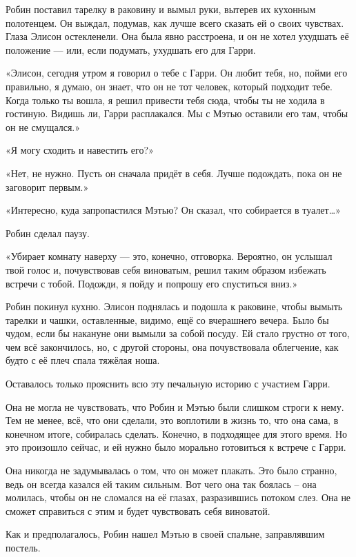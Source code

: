 \documentclass[a4paper,12pt]{book}
\begin{document}
\par
Робин поставил тарелку в раковину и вымыл руки, вытерев их кухонным полотенцем. Он выждал, подумав, как лучше всего сказать ей о своих чувствах. Глаза Элисон остекленели. Она была явно расстроена, и он не хотел ухудшать её положение — или, если подумать, ухудшать его для Гарри.
\par
«Элисон, сегодня утром я говорил о тебе с Гарри. Он любит тебя, но, пойми его правильно, я думаю, он знает, что он не тот человек, который подходит тебе. Когда только ты вошла, я решил привести тебя сюда, чтобы ты не ходила в гостиную. Видишь ли, Гарри расплакался. Мы с Мэтью оставили его там, чтобы он не смущался.»
\par
«Я могу сходить и навестить его?»
\par
«Нет, не нужно. Пусть он сначала придёт в себя. Лучше подождать, пока он не заговорит первым.»
\par
«Интересно, куда запропастился Мэтью? Он сказал, что собирается в туалет…»
\par
Робин сделал паузу.
\par
«Убирает комнату наверху — это, конечно, отговорка. Вероятно, он услышал твой голос и, почувствовав себя виноватым, решил таким образом избежать встречи с тобой. Подожди, я пойду и попрошу его спуститься вниз.»
\par
Робин покинул кухню. Элисон поднялась и подошла к раковине, чтобы вымыть тарелки и чашки, оставленные, видимо, ещё со вчерашнего вечера. Было бы чудом, если бы накануне они вымыли за собой посуду. Ей стало грустно от того, чем всё закончилось, но, с другой стороны, она почувствовала облегчение, как будто с её плеч спала тяжёлая ноша.
\par
Оставалось только прояснить всю эту печальную историю с участием Гарри.
\par
Она не могла не чувствовать, что Робин и Мэтью были слишком строги к нему. Тем не менее, всё, что они сделали, это воплотили в жизнь то, что она сама, в конечном итоге, собиралась сделать. Конечно, в подходящее для этого время. Но это произошло сейчас, и ей нужно было морально готовиться к встрече с Гарри.
\par
Она никогда не задумывалась о том, что он может плакать. Это было странно, ведь он всегда казался ей таким сильным. Вот чего она так боялась – она молилась, чтобы он не сломался на её глазах,  разразившись потоком слез. Она не сможет справиться с этим и будет чувствовать себя виноватой.
\par
Как и предполагалось, Робин нашел Мэтью в своей спальне, заправлявшим постель.
\end{document}
